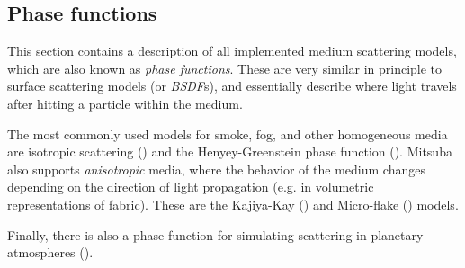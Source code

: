 \newpage
\subsection{Phase functions}
\label{sec:phase}
This section contains a description of all implemented medium scattering models, which 
are also known as \emph{phase functions}. These are very similar in principle to surface 
scattering models (or \emph{BSDF}s), and essentially describe where light travels after 
hitting a particle within the medium.

The most commonly used models for smoke, fog, and other homogeneous media
are isotropic scattering () and the Henyey-Greenstein 
phase function (). Mitsuba also supports \emph{anisotropic}
media, where the behavior of the medium changes depending on the direction 
of light propagation (e.g. in volumetric representations of fabric). These 
are the Kajiya-Kay () and Micro-flake () 
models.

Finally, there is also a phase function for simulating scattering in
planetary atmospheres ().
